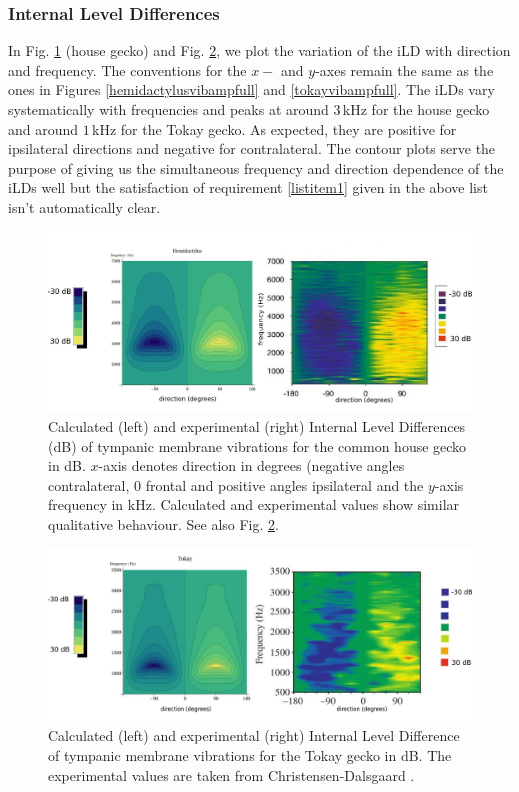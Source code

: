 \subsubsection{Internal Level Differences}
In Fig. \ref{hemidactylusilDboth} (house gecko) and Fig. \ref{tokayilDboth}, we plot the
variation of the iLD with direction and frequency. The conventions for the $x-$ and $y$-axes remain the same as the ones in Figures \ref{hemidactylusvibampfull}
and \ref{tokayvibampfull}. The iLDs vary systematically with frequencies and peaks at around $3\,$kHz for the house gecko and around $1\,$kHz for the Tokay gecko.
As expected, they are positive for ipsilateral directions and negative for contralateral. The contour plots serve the purpose of giving us the simultaneous frequency and direction dependence of the iLDs well but the 
satisfaction of requirement \ref{listitem1} given in the above list isn't automatically clear.
\begin{figure}[ht!]
 \centering
 \includegraphics[width=1.0\linewidth]{Diagrams/Plots/iLD/hemidactylusiLDboth.png}
 \caption[ILD plots for the common house gecko]{Calculated (left) and experimental (right) Internal Level Differences (dB) of tympanic membrane vibrations for the common house gecko
 in dB. $x$-axis denotes direction in degrees (negative angles contralateral, 0 frontal and positive angles ipsilateral and the $y$-axis frequency in kHz. 
 Calculated and experimental values \cite{dalsgaardmanley2} show similar qualitative behaviour. See also Fig. \ref{tokayilDboth}.}
  \label{hemidactylusilDboth}
\end{figure}

\begin{figure}[ht!]
 \centering
 \includegraphics[width=1.0\linewidth]{Diagrams/Plots/iLD/tokayiLDboth.png}
 \caption[ILD plots for the Tokay gecko]{Calculated (left) and experimental (right) Internal Level Difference of tympanic membrane vibrations for the Tokay gecko
 in dB. The experimental values are taken from Christensen-Dalsgaard \cite{dalsgaardmanley1}.}
  \label{tokayilDboth}
\end{figure}

